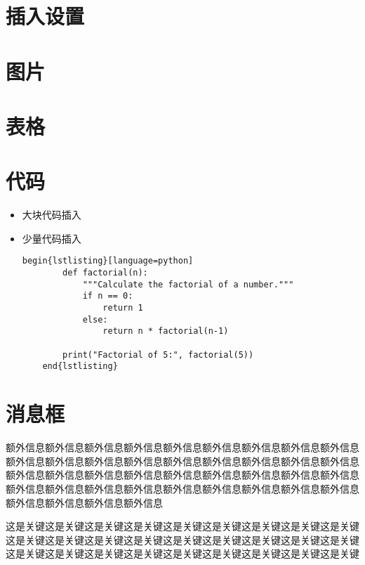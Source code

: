 \section{插入设置}
    \lipsum[1]

\section{图片}
    \lipsum[1]

\section{表格}


    
\section{代码}
\begin{itemize}
    \item 大块代码插入
    
    \item 少量代码插入
    \begin{lstlisting}[language={[LaTeX]TeX}]
    begin{lstlisting}[language=python]
        def factorial(n):
            """Calculate the factorial of a number."""
            if n == 0:
                return 1
            else:
                return n * factorial(n-1)

        print("Factorial of 5:", factorial(5))        
    end{lstlisting}
    \end{lstlisting}
\end{itemize}


\section{消息框}
\begin{info}
    额外信息额外信息额外信息额外信息额外信息额外信息额外信息额外信息额外信息额外信息额外信息额外信息额外信息额外信息额外信息额外信息额外信息额外信息额外信息额外信息额外信息额外信息额外信息额外信息额外信息额外信息额外信息额外信息额外信息额外信息额外信息额外信息额外信息额外信息额外信息额外信息额外信息额外信息额外信息额外信息
\end{info}

\begin{keypoint}
    这是关键这是关键这是关键这是关键这是关键这是关键这是关键这是关键这是关键这是关键这是关键这是关键这是关键这是关键这是关键这是关键这是关键这是关键这是关键这是关键这是关键这是关键这是关键这是关键这是关键这是关键这是关键
\end{keypoint}


